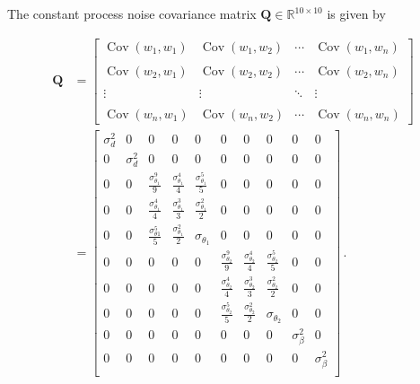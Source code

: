 The constant process noise covariance matrix $\mathbf{Q} \in \mathbb{R}^{10 \times 10}$ is given by

\begin{equation}
\begin{split}
\mathbf{Q} &= \begin{bmatrix}
 \operatorname{Cov}(w_1,w_1) & \operatorname{Cov}(w_1,w_2) & \cdots & \operatorname{Cov}(w_1,w_n) \\ \\
 \operatorname{Cov}(w_2,w_1) & \operatorname{Cov}(w_2,w_2) & \cdots & \operatorname{Cov}(w_2,w_n) \\ \\
 \vdots & \vdots & \ddots & \vdots \\ \\
 \operatorname{Cov}(w_n,w_1) & \operatorname{Cov}(w_n,w_2) & \cdots & \operatorname{Cov}(w_n,w_n)
\end{bmatrix} \\
&= \begin{bmatrix}
  \sigma^2_d & 0 & 0 & 0 & 0 & 0 & 0 & 0 & 0 & 0\\
  0 & \sigma^2_d & 0 & 0 & 0 & 0 & 0 & 0 & 0 & 0\\
  0 & 0 & \frac{\sigma^9_{\theta_1}}{9} & \frac{\sigma^4_{\theta_1}}{4} & \frac{\sigma^5_{\theta_1}}{5} & 0 & 0 & 0 & 0 & 0\\
  0 & 0 & \frac{\sigma^4_{\theta_1}}{4} & \frac{\sigma^3_{\theta_1}}{3} & \frac{\sigma^2_{\theta_1}}{2} & 0 & 0 & 0 & 0 & 0\\
  0 & 0 & \frac{\sigma^5_{\theta 1}}{5} & \frac{\sigma^2_{\theta_1}}{2} & \sigma_{\theta_1} & 0 & 0 & 0 & 0 & 0\\
  0 & 0 & 0 & 0 & 0 & \frac{\sigma^9_{\theta_2}}{9} & \frac{\sigma^4_{\theta_2}}{4} & \frac{\sigma^5_{\theta_2}}{5} & 0 & 0\\
  0 & 0 & 0 & 0 & 0 & \frac{\sigma^4_{\theta_2}}{4} & \frac{\sigma^3_{\theta_2}}{3} & \frac{\sigma^2_{\theta_2}}{2} & 0 & 0\\
  0 & 0 & 0 & 0 & 0 & \frac{\sigma^5_{\theta_2}}{5} & \frac{\sigma^2_{\theta_2}}{2} & \sigma_{\theta_2} & 0 & 0\\
  0 & 0 & 0 & 0 & 0 & 0 & 0 & 0 & \sigma^2_{\beta} & 0\\
  0 & 0 & 0 & 0 & 0 & 0 & 0 & 0 & 0 & \sigma^2_{\beta}\\
\end{bmatrix}\,.
\end{split}
\end{equation}


